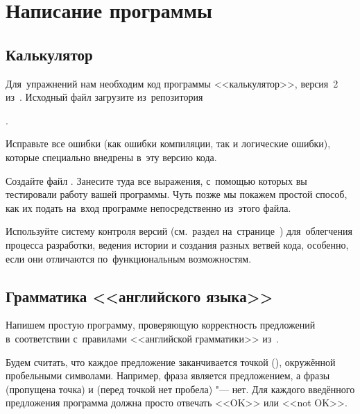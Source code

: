 
\chapter{Написание программы}

\section{Калькулятор}
Для~упражнений нам необходим код программы <<калькулятор>>, версия~2 из~. Исходный файл загрузите из~репозитория
\begin{center}
  .
\end{center}

Исправьте все ошибки (как ошибки компиляции, так и логические ошибки), которые специально внедрены в~эту версию кода.

Создайте файл . Занесите туда все выражения, с~помощью которых вы тестировали работу вашей программы. Чуть позже мы покажем простой способ, как их подать на~вход программе непосредственно из~этого файла.

Используйте систему контроля версий (см.~раздел на~странице~\pageref{sect:git}) для~облегчения процесса разработки, ведения истории и создания разных ветвей кода, особенно, если они отличаются по~функциональным возможностям.



\section{Грамматика <<английского языка>>}
Напишем простую программу, проверяющую корректность предложений в~соответствии с~правилами <<английской грамматики>> из~.


Будем считать, что каждое предложение заканчивается точкой (), окружённой пробельными символами. Например, фраза  является предложением, а фразы  (пропущена точка) и  (перед точкой нет пробела) "--- нет. Для каждого введённого предложения программа должна просто отвечать <<OK>> или <<not OK>>.

